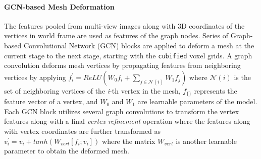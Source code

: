 \paragraph{GCN-based Mesh Deformation}
The features pooled from multi-view images along with 3D coordinates of the vertices in world frame are used as features of the graph nodes.
Series of Graph-based Convolutional Network (GCN) blocks are applied to deform a mesh at the current stage to the next stage, starting with the \texttt{cubified} voxel grids.
A graph convolution deforms mesh vertices by propagating features from neighboring vertices by applying
$f_{i}^{'} = ReLU(W_0f_i + \sum_{j \in \mathcal{N}(i)} W_1 f_j)$ where $\mathcal{N}(i)$ is the set of neighboring vertices of the \emph{i}-th vertex in the mesh, $f_{\{\}}$ represents the feature vector of a vertex, and $W_0$ and $W_1$ are learnable parameters of the model.
Each GCN block utilizes several graph convolutions to transform the vertex features along with a final \emph{vertex refinement} operation where the features along with vertex coordinates are further transformed as $v_i^{'} = v_i + tanh(W_{vert}[f_i;v_i])$ where the matrix $W_{vert}$ is another learnable parameter to obtain the deformed mesh.

\label{subsec:contrastive_depth_feature_extraction}
